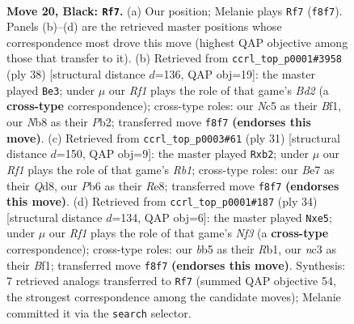 \documentclass[11pt]{article}
\begin{document}
\clearpage

\begin{figure}[p]\centering
\begin{subfigure}{0.46\textwidth}\centering
\resizebox{\linewidth}{!}{%
\newchessgame
\chessboard[
  setfen={rn1qkr2/p2bb3/1p4Q1/1Bnp2P1/P7/2N2N2/1P3P2/R1B1K2R b KQ - 0 20},
  showmover=false,
  pgfstyle=straightmove, color=movearrow, markmove={f8-f7}
]}
\caption{}
\end{subfigure}\hfill
\begin{subfigure}{0.46\textwidth}\centering
\resizebox{\linewidth}{!}{%
\newchessgame
\chessboard[
  setfen={r3k2r/1p1bbp2/p1n1p2p/4q3/4P2P/P1N4R/1PQB1P2/2R1KB2 w kq - 2 20},
  showmover=false,
  pgfstyle=straightmove, color=movearrow, markmove={d2-e3}
]}
\caption{}
\end{subfigure}
\\[4pt]
\begin{subfigure}{0.46\textwidth}\centering
\resizebox{\linewidth}{!}{%
\newchessgame
\chessboard[
  setfen={1r1qr1k1/p2bbppp/Q2p4/8/4PBn1/2N5/PPP1B1PP/R4R1K b - - 2 16},
  showmover=false,
  pgfstyle=straightmove, color=movearrow, markmove={b8-b2}
]}
\caption{}
\end{subfigure}\hfill
\begin{subfigure}{0.46\textwidth}\centering
\resizebox{\linewidth}{!}{%
\newchessgame
\chessboard[
  setfen={r3kbnr/1ppb3p/p1n1p3/3pp2N/3P4/5N1R/q2B1PP1/1R1QKB2 w kq - 4 18},
  showmover=false,
  pgfstyle=straightmove, color=movearrow, markmove={f3-e5}
]}
\caption{}
\end{subfigure}
\caption{\textbf{Move 20, Black: \texttt{Rf7}.} (a) Our position; Melanie plays \texttt{Rf7} (\texttt{f8f7}). Panels (b)--(d) are the retrieved master positions whose correspondence most drove this move (highest QAP objective among those that transfer to it). (b) Retrieved from \texttt{ccrl\_top\_p0001\#3958} (ply 38) [structural distance $d$=136, QAP obj=19]: the master played \texttt{Be3}; under $\mu$ our \emph{Rf1} plays the role of that game's \emph{Bd2} (a \textbf{cross-type} correspondence); cross-type roles: our \emph{N}c5 as their \emph{B}f1, our \emph{N}b8 as their \emph{P}b2; transferred move \texttt{f8f7} \textbf{(endorses this move)}. (c) Retrieved from \texttt{ccrl\_top\_p0003\#61} (ply 31) [structural distance $d$=150, QAP obj=9]: the master played \texttt{Rxb2}; under $\mu$ our \emph{Rf1} plays the role of that game's \emph{Rb1}; cross-type roles: our \emph{B}e7 as their \emph{Q}d8, our \emph{P}b6 as their \emph{R}e8; transferred move \texttt{f8f7} \textbf{(endorses this move)}. (d) Retrieved from \texttt{ccrl\_top\_p0001\#187} (ply 34) [structural distance $d$=134, QAP obj=6]: the master played \texttt{Nxe5}; under $\mu$ our \emph{Rf1} plays the role of that game's \emph{Nf3} (a \textbf{cross-type} correspondence); cross-type roles: our \emph{b}b5 as their \emph{R}b1, our \emph{n}c3 as their \emph{B}f1; transferred move \texttt{f8f7} \textbf{(endorses this move)}. Synthesis: 7 retrieved analogs transferred to \texttt{Rf7} (summed QAP objective 54, the strongest correspondence among the candidate moves); Melanie committed it via the \texttt{search} selector.}
\label{fig:thought-m39}
\end{figure}
\end{document}
